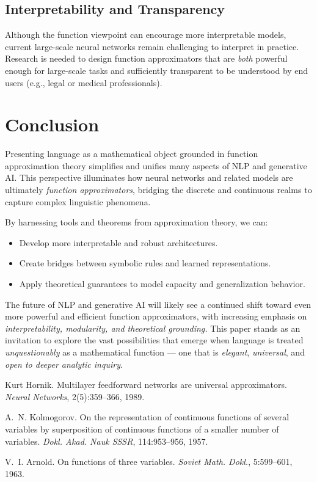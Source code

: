 \documentclass[11pt]{article}
\begin{document}
\subsection{Interpretability and Transparency}
Although the function viewpoint can encourage more interpretable models, current large-scale neural networks remain challenging to interpret in practice. Research is needed to design function approximators that are \emph{both} powerful enough for large-scale tasks and sufficiently transparent to be understood by end users (e.g., legal or medical professionals).

\section{Conclusion}
\label{sec:conclusion}
Presenting language as a mathematical object grounded in function approximation theory simplifies and unifies many aspects of NLP and generative AI. This perspective illuminates how neural networks and related models are ultimately \emph{function approximators}, bridging the discrete and continuous realms to capture complex linguistic phenomena. 

By harnessing tools and theorems from approximation theory, we can:
\begin{itemize}
    \item Develop more interpretable and robust architectures.
    \item Create bridges between symbolic rules and learned representations.
    \item Apply theoretical guarantees to model capacity and generalization behavior.
\end{itemize}

The future of NLP and generative AI will likely see a continued shift toward even more powerful and efficient function approximators, with increasing emphasis on \emph{interpretability, modularity, and theoretical grounding.} This paper stands as an invitation to explore the vast possibilities that emerge when language is treated \emph{unquestionably} as a mathematical function --- one that is \emph{elegant}, \emph{universal}, and \emph{open to deeper analytic inquiry}.

\begin{thebibliography}{9}

Kurt Hornik.
\newblock Multilayer feedforward networks are universal approximators.
\newblock \emph{Neural Networks}, 2(5):359--366, 1989.

A.~N. Kolmogorov.
\newblock On the representation of continuous functions of several variables by superposition of continuous functions of a smaller number of variables.
\newblock \emph{Dokl. Akad. Nauk SSSR}, 114:953--956, 1957.

V.~I. Arnold.
\newblock On functions of three variables.
\newblock \emph{Soviet Math. Dokl.}, 5:599--601, 1963.

\end{thebibliography}
\end{document}
